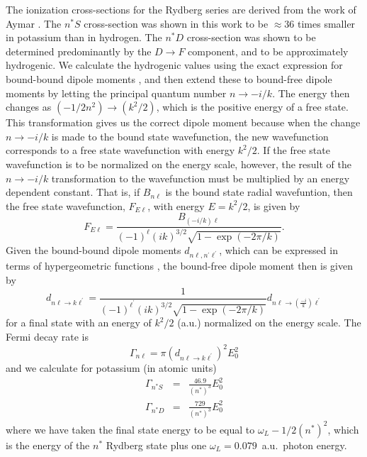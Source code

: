 The ionization cross-sections for the Rydberg series are derived from the work
of Aymar \etal \cite{Aymar:76}.  The $n^*S$ cross-section was shown in this
work to be $\approx 36$ times smaller in potassium than in hydrogen.  The $n^*D$
cross-section was shown to be determined predominantly by the $D \rightarrow F$
component, and to be approximately hydrogenic.  We calculate the hydrogenic
values using the exact expression for bound-bound dipole moments
\cite{Bethe_Salpeter}, and then extend these to bound-free dipole
moments by letting the principal quantum number $n \rightarrow -i/k$.  The
energy then changes as $(-1/2n^2) \rightarrow (k^2/2)$, which is the
positive energy of a free state.  This transformation gives us the correct
dipole moment because when the change $n \rightarrow -i/k$ is made to the bound
state wavefunction, the new wavefunction corresponds to a free state
wavefunction with energy $k^2/2$.  If the free state wavefunction is to be
normalized on the energy scale, however, the result of the $n \rightarrow
-i/k$ transformation to the wavefunction must be multiplied by an energy
dependent constant.  That is, if $B_{n\ell}$ is the bound state radial
wavefuntion, then the free state wavefunction, $F_{E\ell}$, with energy $E =
k^2/2$, is given by
\cite{Bethe_Salpeter}
\begin{equation}
F_{E\ell} = \frac{B_{(-i/k)\ell}}{(-1)^{\ell}(ik)^{3/2}\sqrt{1 -\exp(-2\pi/k)}}.
\end{equation}
Given the bound-bound dipole moments $d_{n\ell,n^{'}\ell^{'}}$, which can be
expressed in terms of hypergeometric functions
\cite{Bethe_Salpeter}, the bound-free dipole moment then is given by
\begin{equation}
d_{n\ell\rightarrow k\ell^{'}} = \frac{1}{(-1)^{\ell^{'}}(ik)^{3/2}\sqrt{1
-\exp(-2\pi/k)}} d_{n\ell \rightarrow \left(\frac{-i}{k}\right)\ell^{'}}
\end{equation}
for a final state with an energy of $k^2/2$ (a.u.) normalized on the energy
scale.  The Fermi decay rate is \cite{Gottfried_book}
\begin{equation}
\Gamma_{n\ell} = \pi \left(d_{n\ell \rightarrow
k\ell^{'}}\right)^2 E_0^2
\label{H_ion}
\end{equation}
and we calculate for potassium (in atomic units)
\begin{eqnarray}
\Gamma_{n^*S} &=& \frac{46.9}{(n^*)^3} E_0^2 \\
\Gamma_{n^*D} &=& \frac{729}{(n^*)^3}  E_0^2
\end{eqnarray}
where we have taken the final state energy to be equal to $ \omega_L
-1/2(n^*)^2$, which is the energy of the $n^*$ Rydberg state plus one $\omega_L
= 0.079$~a.u.\ photon energy.

